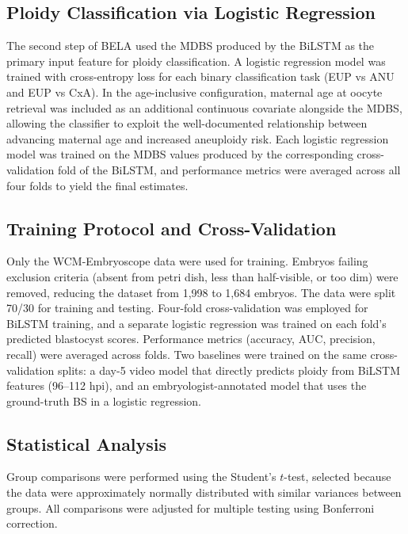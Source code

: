 \documentclass[11pt]{article}
\begin{document}
\subsection{Ploidy Classification via Logistic Regression}

The second step of BELA used the MDBS produced by the BiLSTM as the primary input feature for ploidy classification. A logistic regression model was trained with cross-entropy loss for each binary classification task (EUP vs ANU and EUP vs CxA). In the age-inclusive configuration, maternal age at oocyte retrieval was included as an additional continuous covariate alongside the MDBS, allowing the classifier to exploit the well-documented relationship between advancing maternal age and increased aneuploidy risk. Each logistic regression model was trained on the MDBS values produced by the corresponding cross-validation fold of the BiLSTM, and performance metrics were averaged across all four folds to yield the final estimates.

\subsection{Training Protocol and Cross-Validation}

Only the WCM-Embryoscope data were used for training. Embryos failing exclusion criteria (absent from petri dish, less than half-visible, or too dim) were removed, reducing the dataset from 1{,}998 to 1{,}684 embryos. The data were split 70/30 for training and testing. Four-fold cross-validation was employed for BiLSTM training, and a separate logistic regression was trained on each fold's predicted blastocyst scores. Performance metrics (accuracy, AUC, precision, recall) were averaged across folds. Two baselines were trained on the same cross-validation splits: a day-5 video model that directly predicts ploidy from BiLSTM features (96--112 hpi), and an embryologist-annotated model that uses the ground-truth BS in a logistic regression.

\subsection{Statistical Analysis}

Group comparisons were performed using the Student's $t$-test, selected because the data were approximately normally distributed with similar variances between groups. All comparisons were adjusted for multiple testing using Bonferroni correction.




\end{document}
